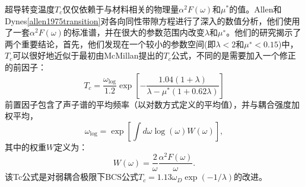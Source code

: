 超导转变温度$T_c$仅仅依赖于与材料相关的物理量$\alpha^2 F(\omega)$和$\mu^*$的值。Allen和Dynes\ref{allen1975transition}对各向同性带隙方程进行了深入的数值分析，他们使用了一套$\alpha^2 F(\omega)$的标准谱，并在很大的参数范围内改变$\lambda$和$\mu^∗$。他们的研究揭示了两个重要结论，首先，他们发现在一个较小的参数空间(即$\lambda<2$和$\mu^∗<0.15$)中，$T_c$可以很好地近似于最初由McMillan\cite{mcmillan1968transition}提出的$T_c$公式，不同的是需要加入一个修正的前因子：
\begin{equation}
  T_c = \frac{\omega_{\mathrm{log}}}{1.2}
  \exp{\left[ {-\frac{1.04(1+\lambda)}{\lambda-\mu^*(1+0.62\lambda)}} \right]}
\end{equation}
前置因子包含了声子谱的平均频率（以对数方式定义的平均值），并与耦合强度加权平均，
\begin{equation}
  \omega_\mathrm{log} = \exp \left[ {\int d\omega \log(\omega)W(\omega)} \right],
\end{equation}
其中的权重$W$定义为：
\begin{equation}
  W(\omega) = \frac{2}{\omega} \frac{\alpha^2 F(\omega)}{\omega}.
\end{equation}
该Tc公式是对弱耦合极限下BCS公式$T_c = 1.13 \omega_D \exp(−1/\lambda)$的改进。
